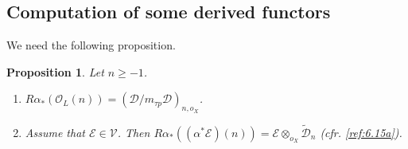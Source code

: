 \documentclass{amsproc}
\def\Dscr{{\mathcal D}}
\def\Escr{{\mathcal E}}
\def\Oscr{{\mathcal O}}
\def\Vscr{{\mathcal V}}
\newtheorem{propositions}[lemmas]{Proposition}
\theoremstyle{definition}
\theoremstyle{remark}
\numberwithin{equation}{section}
\numberwithin{table}{section}
\numberwithin{figure}{section}
\begin{document}
\subsection{Computation of some derived functors}
\label{ref:8.3a}





We need the following proposition.
\begin{propositions} 
\label{ref:8.3.1a}
Let $n\ge -1$.
\begin{enumerate} 
\item $R\alpha_\ast (\Oscr_L(n))= (\Dscr/m_{\tau p}\Dscr)_{n,o_X}$.
\item
 Assume that $\Escr\in \Vscr$. Then
$R\alpha_\ast(( \alpha^\ast
\Escr)(n))=\Escr\otimes_{o_X}\tilde{\Dscr}_n$ (cfr. \eqref{ref:6.15a}).
\end{enumerate}
\end{propositions}
\end{document}
